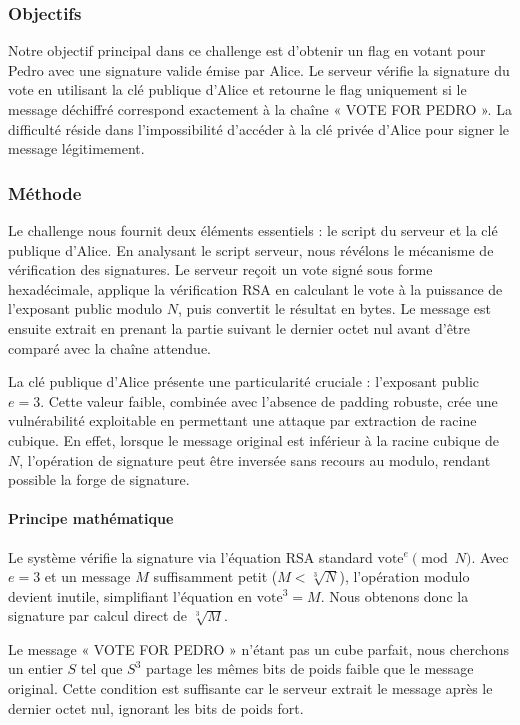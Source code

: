 \subsubsection{Objectifs}
Notre objectif principal dans ce challenge est d’obtenir un flag en votant pour Pedro avec une signature valide émise par Alice. Le serveur vérifie la signature du vote en utilisant la clé publique d’Alice et retourne le flag uniquement si le message déchiffré correspond exactement à la chaîne « VOTE FOR PEDRO ». La difficulté réside dans l’impossibilité d’accéder à la clé privée d’Alice pour signer le message légitimement.


\subsubsection{Méthode}
Le challenge nous fournit deux éléments essentiels : le script du serveur et la clé publique d’Alice. En analysant le script serveur, nous révélons le mécanisme de vérification des signatures. Le serveur reçoit un vote signé sous forme hexadécimale, applique la vérification RSA en calculant le vote à la puissance de l’exposant public modulo $N$, puis convertit le résultat en bytes. Le message est ensuite extrait en prenant la partie suivant le dernier octet nul avant d’être comparé avec la chaîne attendue.

La clé publique d’Alice présente une particularité cruciale : l’exposant public $e = 3$. Cette valeur faible, combinée avec l’absence de padding robuste, crée une vulnérabilité exploitable en permettant une attaque par extraction de racine cubique. En effet, lorsque le message original est inférieur à la racine cubique de $N$, l’opération de signature peut être inversée sans recours au modulo, rendant possible la forge de signature.


\paragraph{Principe mathématique}
Le système vérifie la signature via l’équation RSA standard $\text{vote}^e \pmod{N}$. Avec $e = 3$ et un message $M$ suffisamment petit ($M < \sqrt[3]{N}$), l’opération modulo devient inutile, simplifiant l’équation en $\text{vote}^3 = M$. Nous obtenons donc la signature par calcul direct de $\sqrt[3]{M}$.

Le message « VOTE FOR PEDRO » n’étant pas un cube parfait, nous cherchons un entier $S$ tel que $S^3$ partage les mêmes bits de poids faible que le message original. Cette condition est suffisante car le serveur extrait le message après le dernier octet nul, ignorant les bits de poids fort.


